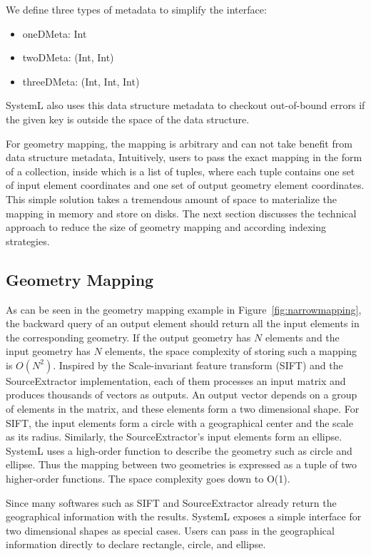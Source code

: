 \documentclass{sig-alternate}
\newenvironment{shortlist}{
        \vspace*{-0.5em}
  \begin{itemize}
  \setlength{\itemsep}{-0.1em}
}{
  \end{itemize}
        \vspace*{-0.5em}
}
\begin{document}
We define three types of metadata to simplify the interface:
\begin{shortlist}
\item{} oneDMeta: Int
\item{} twoDMeta: (Int, Int)
\item{} threeDMeta: (Int, Int, Int)
\end{shortlist}  
SystemL also uses this data structure metadata to checkout out-of-bound errors if the given key is outside the space of the data structure.

For geometry mapping, the mapping is arbitrary and can not take benefit from data structure metadata, 
Intuitively, users to pass the exact mapping in the form of a collection, inside which is a list of tuples, where each tuple 
contains one set of input element coordinates and one set of output geometry element coordinates. 
This simple solution takes a tremendous amount of space to materialize the mapping in memory and store on disks.
The next section discusses the technical approach to reduce the size of geometry mapping and according indexing strategies.


\subsection{Geometry Mapping}
\label{sec:Design-GeometryMapping}
As can be seen in the geometry mapping example in Figure~\ref{fig:narrowmapping}, the backward query of an output element should return all the input elements in the corresponding geometry. If the output geometry has $N$ elements and the input geometry has $N$ elements, the space complexity of storing such a mapping is $O(N^2)$. 
Inspired by the Scale-invariant feature transform (SIFT) and the SourceExtractor implementation, each of them processes an input matrix and produces thousands of vectors as outputs. An output vector depends on a group of elements in the matrix, and these elements form a two dimensional shape. 
For SIFT, the input elements form a circle with a geographical center and the scale as its radius.
Similarly, the SourceExtractor's input elements form an ellipse. 
SystemL uses a high-order function to describe the geometry such as circle and ellipse. 
Thus the mapping between two geometries is expressed as a tuple of two higher-order functions.
The space complexity goes down to O(1).

Since many softwares such as SIFT and SourceExtractor already return the geographical information with the results.
SystemL exposes a simple interface for two dimensional shapes as special cases.
Users can pass in the geographical information directly to declare rectangle, circle, and ellipse.
\end{document}
